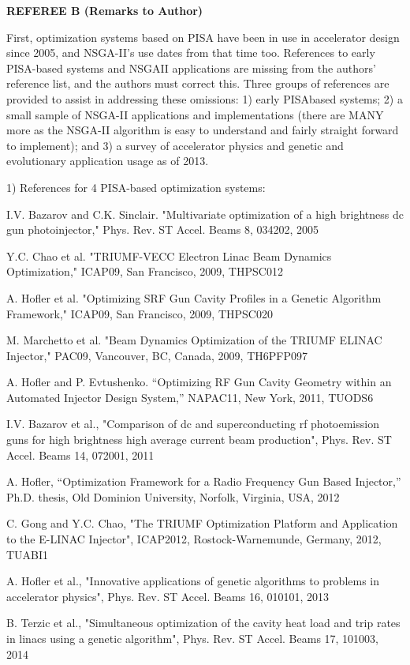 \documentclass{article}
\begin{document}
{\bf REFEREE B (Remarks to Author)}

First, optimization systems based on PISA have been in use in
accelerator design since 2005, and NSGA-II’s use dates from that time
too. References to early PISA-based systems and NSGAII applications
are missing from the authors’ reference list, and the authors must
correct this. Three groups of references are provided to assist in
addressing these omissions: 1) early PISAbased systems; 2) a small
sample of NSGA-II applications and implementations (there are MANY
more as the NSGA-II algorithm is easy to understand and fairly
straight forward to implement); and 3) a survey of accelerator physics
and genetic and evolutionary application usage as of 2013.

1) References for 4 PISA-based optimization systems:

I.V. Bazarov and C.K. Sinclair. "Multivariate optimization of a high
brightness dc gun photoinjector," Phys. Rev. ST Accel. Beams 8,
034202, 2005

Y.C. Chao et al. "TRIUMF-VECC Electron Linac Beam Dynamics
Optimization," ICAP09, San Francisco, 2009, THPSC012

A. Hofler et al. "Optimizing SRF Gun Cavity Profiles in a Genetic
Algorithm Framework," ICAP09, San Francisco, 2009, THPSC020

M. Marchetto et al. "Beam Dynamics Optimization of the TRIUMF ELINAC
Injector," PAC09, Vancouver, BC, Canada, 2009, TH6PFP097

A. Hofler and P. Evtushenko. “Optimizing RF Gun Cavity Geometry within
an Automated Injector Design System,” NAPAC11, New York, 2011, TUODS6

I.V. Bazarov et al., "Comparison of dc and superconducting rf
photoemission guns for high brightness high average current beam
production", Phys. Rev. ST Accel. Beams 14, 072001, 2011

A. Hofler, “Optimization Framework for a Radio Frequency Gun Based
Injector,” Ph.D. thesis, Old Dominion University, Norfolk, Virginia,
USA, 2012

C. Gong and Y.C. Chao, "The TRIUMF Optimization Platform and
Application to the E-LINAC Injector", ICAP2012, Rostock-Warnemunde,
Germany, 2012, TUABI1

A. Hofler et al., "Innovative applications of genetic algorithms to
problems in accelerator physics", Phys. Rev. ST Accel. Beams 16,
010101, 2013

B. Terzic et al., "Simultaneous optimization of the cavity heat load
and trip rates in linacs using a genetic algorithm", Phys. Rev. ST
Accel. Beams 17, 101003, 2014
\end{document}
